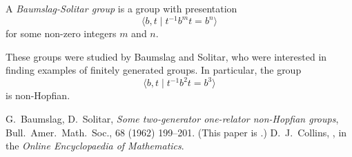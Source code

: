 \documentclass[12pt]{article}
\begin{document}
A \emph{Baumslag-Solitar group} is a group with presentation 
\[
  \langle b,t\mid t^{-1}b^mt=b^n\rangle
\]
for some non-zero integers $m$ and $n$.

These groups were studied by Baumslag and Solitar\cite{bs},
who were interested in finding examples
of finitely generated  groups.
In particular, the group
\[
  \langle b,t\mid t^{-1}b^2t=b^3\rangle
\]
is non-Hopfian.

\begin{thebibliography}{9}
 G.~Baumslag, D.~Solitar,
 {\it Some two-generator one-relator non-Hopfian groups},
 Bull.\ Amer.\ Math.\ Soc., 68 (1962) 199--201.
 (This paper is .)
 D.~J.~Collins,
 {\it {}},
 in the {\it Online Encyclopaedia of Mathematics}.
\end{thebibliography}

\end{document}
